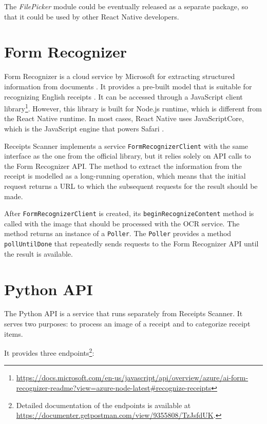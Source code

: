 \documentclass[
  printed, %
  table,   %
  oneside, %
  lof,     %
  lot,     %
]{fithesis3}
\newcommand{\definition}[1]{{#1}}
\begin{document}
The \textit{FilePicker} module could be eventually released as a separate package, so that it could be used by other React Native developers.

\section{Form Recognizer}
\label{sec:form_recognizer}
\definition{Form} Recognizer is a cloud service by Microsoft for extracting structured information from documents \cite{WhatIsFormRecognizer}. It provides a pre-built model that is suitable for recognizing English receipts \cite{FormRecognizerPrebuiltReceiptModel}. It can be accessed through a JavaScript client library\footnote{\url{https://docs.microsoft.com/en-us/javascript/api/overview/azure/ai-form-recognizer-readme?view=azure-node-latest\#recognize-receipts}}. However, this library is built for Node.js runtime, which is different from the React Native runtime. In most cases, React Native uses JavaScriptCore, which is the JavaScript engine that powers Safari \cite{JavaScriptRNEnvironment}.

Receipts Scanner implements a service \texttt{FormRecognizerClient} with the same interface as the one from the official library, but it relies solely on API calls to the Form Recognizer API. The method to extract the information from the receipt is modelled as a long-running operation, which means that the initial request returns a URL to which the subsequent requests for the result should be made.

After \texttt{FormRecognizerClient} is created, its \texttt{beginRecognizeContent} method is called with the image that should be processed with the OCR service. The method returns an instance of a \texttt{Poller}. The \texttt{Poller} provides a method \texttt{pollUntilDone} that repeatedly sends requests to the Form Recognizer API until the result is available.

\section{Python API}
\label{sec:python_api}
The Python API is a service that runs separately from Receipts Scanner. It serves two purposes: to process an image of a receipt and to categorize receipt items.

It provides three endpoints\footnote{Detailed documentation of the endpoints is available at \url{https://documenter.getpostman.com/view/9355808/TzJsfdUK}.}:
\end{document}
